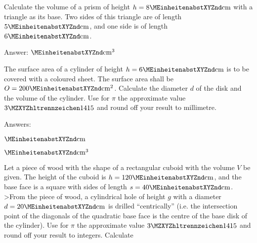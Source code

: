 \begin{MExercises}

\begin{MExercise}
Calculate the volume of a prism of height $h = 8\MEinheit{cm}$ with a triangle
as its base. Two sides of this triangle are of length $5\MEinheit{cm}$, 
and one side is of length $6\MEinheit{cm}$.
\par
Answer: $\MEinheit{cm}^3$
\end{MExercise}

\begin{MExercise}
The surface area of a cylinder of height $h = 6\MEinheit{cm}$ is to be covered 
with a coloured sheet. The surface area shall be $O = 200\MEinheit{cm}^2$. 
Calculate the diameter $d$ of the disk and the volume of the cylinder. Use for 
$\pi$ the approximate value $\MZahl{3}{1415}$ and round off your result 
to millimetre.


Answers:
\begin{MExerciseItems}
\item %
 $\MEinheit{cm}$
\item %
 $\MEinheit{cm}^3$
\end{MExerciseItems}
\end{MExercise}

\begin{MExercise}
Let a piece of wood with the shape of a rectangular cuboid with the volume
$V$ be given. The height of the cuboid is $h = 120\MEinheit{cm}$, and the 
base face is a square with sides of length $s = 40\MEinheit{cm}$.
>From the piece of wood, a cylindrical hole of height $g$ with a diameter 
$d = 20\MEinheit{cm}$ is drilled ``centrically'' (i.e. the intersection 
point of the diagonals of the quadratic base face is the centre of the 
base disk of the cylinder). Use for $\pi$ the approximate value 
$\MZahl{3}{1415}$ and round off your result to integers. Calculate


\end{MExercise}
\end{MExercises}
